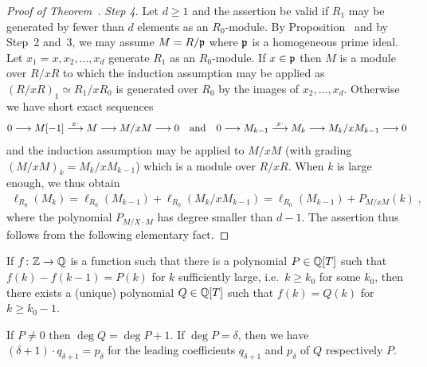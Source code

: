 \documentclass[a4paper,parskip=half,numbers=enddot, DIV=12]{scrreprt}
\begin{document}
\begin{proof}[Proof of Theorem~]
    \emph{Step 4.} Let $d\geq 1$ and the assertion be valid if $R_1$ may be generated by fewer than $d$ elements as an $R_0$-module. By Proposition~ and by Step~2 and~3, we may assume $M=R/\mathfrak{p}$ where $\mathfrak{p}$ is a homogeneous prime ideal. Let $x_1=x,x_2,\ldots, x_d$ generate $R_1$ as an $R_0$-module. If $x\in\mathfrak{p}$ then $M$ is a module over $R/x R$ to which the induction assumption may be applied as $(R/xR)_1\simeq R_1/xR_0$ is generated over $R_0$ by the images of $x_2,\ldots, x_d$. Otherwise we have short exact sequences 
    \begin{align*}
        0 \morphism M[-1] \morphism[x\cdot] M \morphism M/xM \morphism 0\quad\text{and}\quad
        0 \morphism M_{k-1}\morphism[x\cdot] M_k \morphism M_k/x M_{k-1} \morphism 0
    \end{align*}
    and the induction assumption may be applied to $M/xM$ (with grading $(M/xM)_k = M_k/xM_{k-1}$) which is a module over $R/xR$. When $k$ is large enough, we thus obtain
    \begin{align*}
    	\ell_{R_0}(M_k)=\ell_{R_0}(M_{k-1})+\ell_{R_0}(M_k/xM_{k-1})=\ell_{R_0}(M_{k-1})+P_{M/xM}(k)\;,
    \end{align*}
    where the polynomial $P_{M/X\cdot M}$ has degree smaller than $d-1$. The assertion thus follows from the following elementary fact.
\end{proof}
\begin{fact}
    \begin{alphanumerate}
    \item {}
        If $f\colon \IZ\morphism \IQ$ is a function such that there is a polynomial $P\in\mathbb{Q}[T]$ such that $f(k) -f(k-1) = P(k)$ for $k$ sufficiently large, i.e.\ $k\geq k_0$ for some $k_0$, then there exists a (unique) polynomial $Q\in\mathbb{Q}[T]$ such that $f(k) = Q(k)$ for $k\geq k_0-1$. 
    \item 
        If $P\neq 0$ then $\deg Q = \deg P +1$. If $\deg P = \delta$, then we have $(\delta+1) \cdot q_{\delta+1} = p_\delta$ for the leading coefficients $q_{\delta+1}$ and $p_\delta$ of $Q$ respectively $P$. 
    \end{alphanumerate}
\end{fact}
\end{document}
